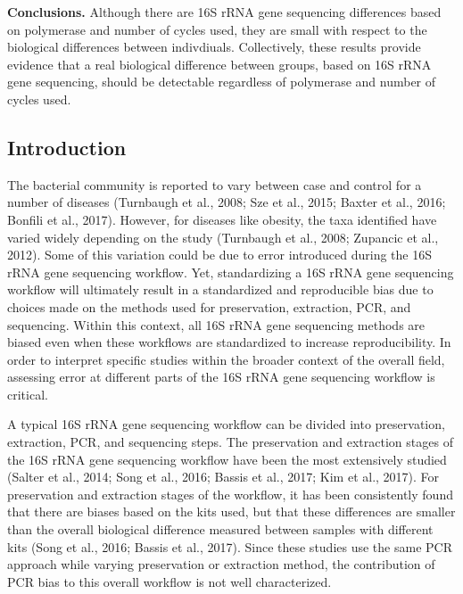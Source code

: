 \documentclass[11pt,]{article}
\begin{document}
\textbf{Conclusions.} Although there are 16S rRNA gene sequencing
differences based on polymerase and number of cycles used, they are
small with respect to the biological differences between indivdiuals.
Collectively, these results provide evidence that a real biological
difference between groups, based on 16S rRNA gene sequencing, should be
detectable regardless of polymerase and number of cycles used.

\newpage

\subsection{Introduction}\label{introduction}

The bacterial community is reported to vary between case and control for
a number of diseases (Turnbaugh et al., 2008; Sze et al., 2015; Baxter
et al., 2016; Bonfili et al., 2017). However, for diseases like obesity,
the taxa identified have varied widely depending on the study (Turnbaugh
et al., 2008; Zupancic et al., 2012). Some of this variation could be
due to error introduced during the 16S rRNA gene sequencing workflow.
Yet, standardizing a 16S rRNA gene sequencing workflow will ultimately
result in a standardized and reproducible bias due to choices made on
the methods used for preservation, extraction, PCR, and sequencing.
Within this context, all 16S rRNA gene sequencing methods are biased
even when these workflows are standardized to increase reproducibility.
In order to interpret specific studies within the broader context of the
overall field, assessing error at different parts of the 16S rRNA gene
sequencing workflow is critical.

A typical 16S rRNA gene sequencing workflow can be divided into
preservation, extraction, PCR, and sequencing steps. The preservation
and extraction stages of the 16S rRNA gene sequencing workflow have been
the most extensively studied (Salter et al., 2014; Song et al., 2016;
Bassis et al., 2017; Kim et al., 2017). For preservation and extraction
stages of the workflow, it has been consistently found that there are
biases based on the kits used, but that these differences are smaller
than the overall biological difference measured between samples with
different kits (Song et al., 2016; Bassis et al., 2017). Since these
studies use the same PCR approach while varying preservation or
extraction method, the contribution of PCR bias to this overall workflow
is not well characterized.
\end{document}
